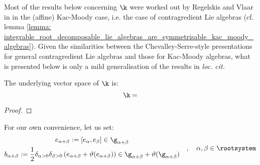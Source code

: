         Most of the results below concerning $\k$ were worked out by Regelskis and Vlaar in \cite[Section 3]{regelskis_vlaar_kac_moody_pseudo_symmetric_pairs} in the (affine) Kac-Moody case, i.e. the case of  contragredient Lie algebras (cf. lemma \ref{lemma: integrable_root_decomposable_lie_algebras_are_symmetrisable_kac_moody_algebras}). Given the similarities between the Chevalley-Serre-style presentations for general contragredient Lie algebras and those for Kac-Moody algebras, what is presented below is only a mild generalisation of the results in \textit{loc. cit.}
        
        \begin{lemma} \label{lemma: underlying_vector_spaces_of_pseudo_fixed_point_subalgebras}
            The underlying vector space of $\k$ is:
                $$\k = $$
        \end{lemma}
            \begin{proof}
                
            \end{proof}
        
        For our own convenience, let us set:
            $$
                \begin{gathered}
                    e_{\alpha + \beta} := [e_{\alpha}, e_{\beta}] \in \g_{\alpha + \beta}
                    \\
                    b_{\alpha + \beta} := \frac12 \delta_{\alpha > 0} \delta_{\beta > 0} \left( e_{\alpha + \beta} + \vartheta(e_{\alpha + \beta}) \right) \in \g_{\alpha + \beta} + \vartheta(\g_{\alpha + \beta})
                \end{gathered}
                \quad, \quad \alpha, \beta \in \rootsystem
            $$

